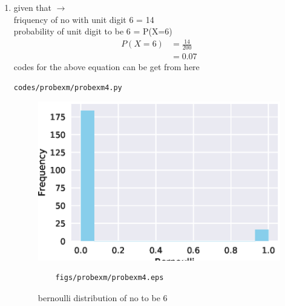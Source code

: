 \renewcommand{\theequation}{\theenumi}
\begin{enumerate}[label=\arabic*.,ref=\thesubsection.\theenumi]
\item given that $\to$
\\friquency of no with unit digit 6 = 14
\\
probability of unit digit to be 6 = P(X=6)
\\
\begin{align} 
P\left(X=6\right) &= \frac{14}{200}
\\
&= 0.07
\end{align}
codes for the above equation can be get from here
\begin{lstlisting}
codes/probexm/probexm4.py
\end{lstlisting}
\begin{figure}[!ht]
	\centering
	\includegraphics[width=\columnwidth]{./figures/probexm/probexm4.eps}
	\caption{bernoulli distribution of no to be 6}
	\label{fig:bt2}
	\begin{lstlisting}
	figs/probexm/probexm4.eps
	\end{lstlisting}
\end{figure}
\end{enumerate}